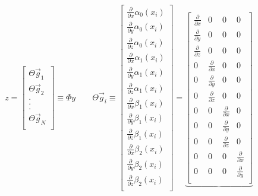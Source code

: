 \documentclass[10pt]{amsart}
\begin{document}
\[
z = 
\begin{bmatrix}
\Theta \vec{g}_1\\
\Theta \vec{g}_2\\
     .   \\
     .   \\
     .   \\
\Theta \vec{g}_N\\
\end{bmatrix} 
\equiv
\Phi y
\qquad
\Theta \vec{g}_i
\equiv
\begin{bmatrix} 
 \frac{\partial }{\partial x} \alpha_0(x_i) \\
 \frac{\partial }{\partial y} \alpha_0(x_i) \\
 \frac{\partial }{\partial z} \alpha_0(x_i) \\
 \frac{\partial }{\partial x} \alpha_1(x_i) \\
 \frac{\partial }{\partial y} \alpha_1(x_i) \\
 \frac{\partial }{\partial z} \alpha_1(x_i) \\
 \frac{\partial }{\partial x}  \beta_1(x_i) \\
 \frac{\partial }{\partial y}  \beta_1(x_i) \\
 \frac{\partial }{\partial z}  \beta_1(x_i) \\
 \frac{\partial }{\partial x}  \beta_2(x_i) \\
 \frac{\partial }{\partial y}  \beta_2(x_i) \\
 \frac{\partial }{\partial z}  \beta_2(x_i) \\
\end{bmatrix} 
=
\underbrace{
\begin{bmatrix} 
 \frac{\partial }{\partial x} & 0 & 0 & 0 \\
 \frac{\partial }{\partial y} & 0 & 0 & 0 \\
 \frac{\partial }{\partial z} & 0 & 0 & 0 \\
 0 & \frac{\partial }{\partial x} & 0 & 0 \\
 0 & \frac{\partial }{\partial y} & 0 & 0 \\
 0 & \frac{\partial }{\partial z} & 0 & 0 \\
 0 & 0 & \frac{\partial }{\partial x} & 0 \\
 0 & 0 & \frac{\partial }{\partial y} & 0 \\
 0 & 0 & \frac{\partial }{\partial z} & 0 \\
 0 & 0 & 0 & \frac{\partial }{\partial x} \\
 0 & 0 & 0 & \frac{\partial }{\partial y} \\

\end{bmatrix}}\]
\end{document}
